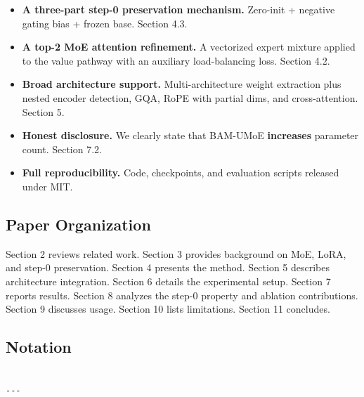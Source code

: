 \begin{itemize}
\item \textbf{A three-part step-0 preservation mechanism.} Zero-init + negative
  gating bias + frozen base. Section 4.3.
\item \textbf{A top-2 MoE attention refinement.} A vectorized expert mixture applied
  to the value pathway with an auxiliary load-balancing loss. Section 4.2.
\item \textbf{Broad architecture support.} Multi-architecture weight extraction plus
  nested encoder detection, GQA, RoPE with partial dims, and cross-attention.
  Section 5.
\item \textbf{Honest disclosure.} We clearly state that BAM-UMoE \textbf{increases}
  parameter count. Section 7.2.
\item \textbf{Full reproducibility.} Code, checkpoints, and evaluation scripts released
  under MIT.

\end{itemize}
\subsection{Paper Organization}

Section 2 reviews related work. Section 3 provides background on MoE, LoRA, 
and step-0 preservation. Section 4 presents the method. Section 5 describes 
architecture integration. Section 6 details the experimental setup. Section 7 
reports results. Section 8 analyzes the step-0 property and ablation 
contributions. Section 9 discusses usage. Section 10 lists limitations. 
Section 11 concludes.



\subsection{Notation}

\begin{lstlisting}

---
\end{lstlisting}